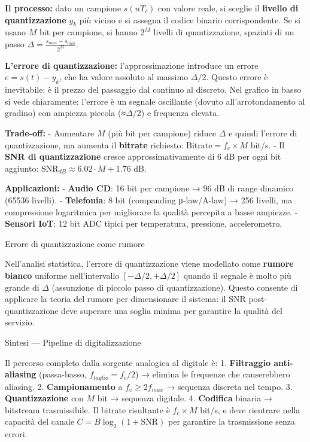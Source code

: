 \documentclass[
  italian,
  openany]{book}
\begin{document}
\textbf{Il processo:} dato un campione \(s(nT_c)\) con valore reale, si
sceglie il \textbf{livello di quantizzazione} \(y_k\) più vicino e si
assegna il codice binario corrispondente. Se si usano \(M\) bit per
campione, si hanno \(2^M\) livelli di quantizzazione, spaziati di un
passo \(\Delta = \frac{s_{max} - s_{min}}{2^M}\).

\textbf{L'errore di quantizzazione:} l'approssimazione introduce un
errore \(e = s(t) - y_k\), che ha valore assoluto al massimo
\(\Delta/2\). Questo errore è inevitabile: è il prezzo del passaggio dal
continuo al discreto. Nel grafico in basso si vede chiaramente: l'errore
è un segnale oscillante (dovuto all'arrotondamento al gradino) con
ampiezza piccola (≈\(\Delta/2\)) e frequenza elevata.

\textbf{Trade-off:} - Aumentare \(M\) (più bit per campione) riduce
\(\Delta\) e quindi l'errore di quantizzazione, ma aumenta il
\textbf{bitrate} richiesto: \(\text{Bitrate} = f_c \times M\) bit/s. -
Il \textbf{SNR di quantizzazione} cresce approssimativamente di 6 dB per
ogni bit aggiunto: \(\text{SNR}_{dB} \approx 6.02 \cdot M + 1.76\) dB.

\textbf{Applicazioni:} - \textbf{Audio CD}: 16 bit per campione → 96 dB
di range dinamico (65536 livelli). - \textbf{Telefonia}: 8 bit
(companding μ-law/A-law) → 256 livelli, ma compressione logaritmica per
migliorare la qualità percepita a basse ampiezze. - \textbf{Sensori
IoT}: 12 bit ADC tipici per temperatura, pressione, accelerometro.

\begin{calloutnote}{Errore di quantizzazione come rumore}

Nell'analisi statistica, l'errore di quantizzazione viene modellato come
\textbf{rumore bianco} uniforme nell'intervallo
\([-\Delta/2, +\Delta/2]\) quando il segnale è molto più grande di
\(\Delta\) (assunzione di piccolo passo di quantizzazione). Questo
consente di applicare la teoria del rumore per dimensionare il sistema:
il SNR post-quantizzazione deve superare una soglia minima per garantire
la qualità del servizio.

\end{calloutnote}

\begin{calloutnote}{Sintesi — Pipeline di digitalizzazione}

Il percorso completo dalla sorgente analogica al digitale è: 1.
\textbf{Filtraggio anti-aliasing} (passa-basso, \(f_{taglio} = f_c/2\))
→ elimina le frequenze che causerebbero aliasing. 2.
\textbf{Campionamento} a \(f_c \geq 2 f_{max}\) → sequenza discreta nel
tempo. 3. \textbf{Quantizzazione} con \(M\) bit → sequenza digitale. 4.
\textbf{Codifica} binaria → bitstream trasmissibile. Il bitrate
risultante è \(f_c \times M\) bit/s, e deve rientrare nella capacità del
canale \(C = B \log_2(1 + \text{SNR})\) per garantire la trasmissione
senza errori.

\end{calloutnote}

\newpage

\backmatter
\end{document}

